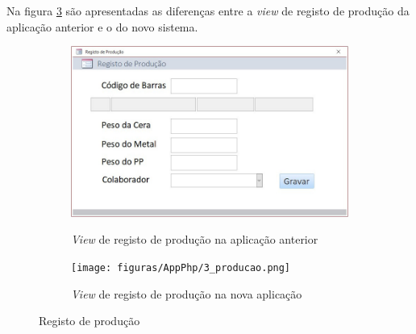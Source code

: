 Na figura \ref{fig:comparacao_producao} são apresentadas as diferenças entre a \textit{view} de registo de produção da aplicação anterior e o do novo sistema.
\begin{figure}[H]
	\centering
	
	\begin{subfigure}[t]{0.45\linewidth}
		\includegraphics[width=\linewidth]{figuras/AppAccess/3-Producao.jpg}
		\label{fig:comparacao_producao_1}
		\caption{\textit{View} de registo de produção na aplicação anterior}
	\end{subfigure}
	\begin{subfigure}[t]{0.45\linewidth}
		\texttt{[image: figuras/AppPhp/3\_producao.png]}
		\label{fig:comparacao_producao_2}
		\caption{\textit{View} de registo de produção na nova aplicação}
	\end{subfigure}
	
	\caption{Registo de produção}
	\label{fig:comparacao_producao}
\end{figure}

